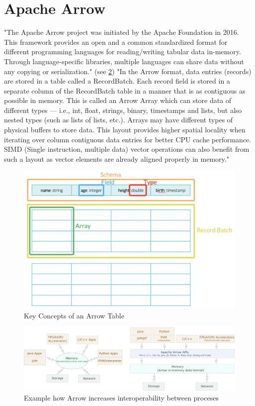 \section{Apache Arrow}
\label{section:arrow}
"The Apache Arrow project was initiated by the Apache Foundation in 2016.
This framework provides an open and a common standardized format for different programming languages for reading/writing tabular data in-memory.
Through language-specific libraries, multiple languages can share data without any copying or serialization." \autocite{Ahmad2020} (see \ref{fig:arrow_com})
"In the Arrow format, data entries (records) are stored in a table called a RecordBatch.
Each record field is stored in a separate column of the RecordBatch table in a manner that is as contiguous as possible in memory.
This is called an Arrow Array which can store data of different types — i.e., int, float, strings, binary, timestamps and lists, but also nested types (such as lists of lists, etc.).
Arrays may have different types of physical buffers to store data.
This layout provides higher spatial locality when iterating over column contiguous data entries for better CPU cache performance.
SIMD (Single instruction, multiple data) vector operations can also benefit from such a layout as vector elements are already aligned properly in memory." \autocite{Ahmad2020}

\begin{figure}
	\includegraphics[width=\textwidth]{resources/arrow_tab}
	\caption{Key Concepts of an Arrow Table \autocite{Dremio}}
	\label{fig:arrow_tab}
\end{figure}
\begin{figure}
	\includegraphics[width=\textwidth]{resources/arrow_interop}
	\caption{Example how Arrow increases interoperability between proceses \autocite{Ahmad2020}}
	\label{fig:arrow_com}
\end{figure}

